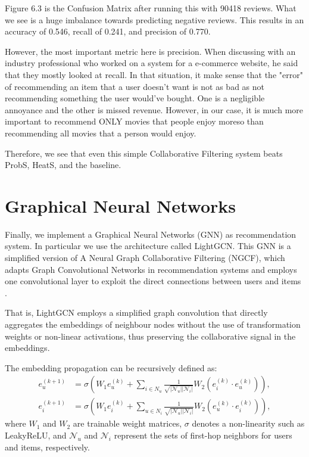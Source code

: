 \documentclass[12pt]{article}
\numberwithin{equation}{section}
\begin{document}
Figure 6.3 is the Confusion Matrix after running this with 90418 reviews. What we see is a huge imbalance towards predicting negative reviews. This results in an accuracy of 0.546, recall of 0.241, and precision of 0.770.

However, the most important metric here is precision. When discussing with an industry professional who worked on a system for a e-commerce website, he said that they mostly looked at recall. In that situation, it make sense that the "error" of recommending an item that a user doesn't want is not as bad as not recommending something the user would've bought. One is a negligible annoyance and the other is missed revenue. However, in our case, it is much more important to recommend ONLY movies that people enjoy moreso than recommending all movies that a person would enjoy. 

Therefore, we see that even this simple Collaborative Filtering system beats ProbS, HeatS, and the baseline.

\section{Graphical Neural Networks}

Finally, we implement a Graphical Neural Networks (GNN) as recommendation system. In particular we use the architecture called LightGCN. This GNN is a simplified version of A Neural Graph Collaborative Filtering (NGCF), which adapts Graph Convolutional Networks in recommendation systems and employs one convolutional layer to exploit the direct connections between users and items \cite{lightgcn}. 

That is, LightGCN employs a simplified graph convolution that directly aggregates the embeddings of neighbour nodes without the use of transformation weights or non-linear activations, thus preserving the collaborative signal in the embeddings.

The embedding propagation can be recursively defined as:
\begin{align*}
	e_u^{(k+1)} &= \sigma \left( W_1 e_u^{(k)} + \sum_{i \in N_u} \frac{1}{\sqrt{|\mathcal{N}_u||\mathcal{N}_i|}} W_2 (e_i^{(k)} \cdot e_u^{(k)}) \right), \\
	e_i^{(k+1)} &= \sigma \left( W_1 e_i^{(k)} + \sum_{u \in N_i} \frac{1}{\sqrt{|\mathcal{N}_u||\mathcal{N}_i|}} W_2 (e_u^{(k)} \cdot e_i^{(k)}) \right),
\end{align*}
where $W_1$ and $W_2$ are trainable weight matrices, $\sigma$ denotes a non-linearity such as LeakyReLU, and $\mathcal{N}_u$ and $\mathcal{N}_i$ represent the sets of first-hop neighbors for users and items, respectively.
\end{document}
